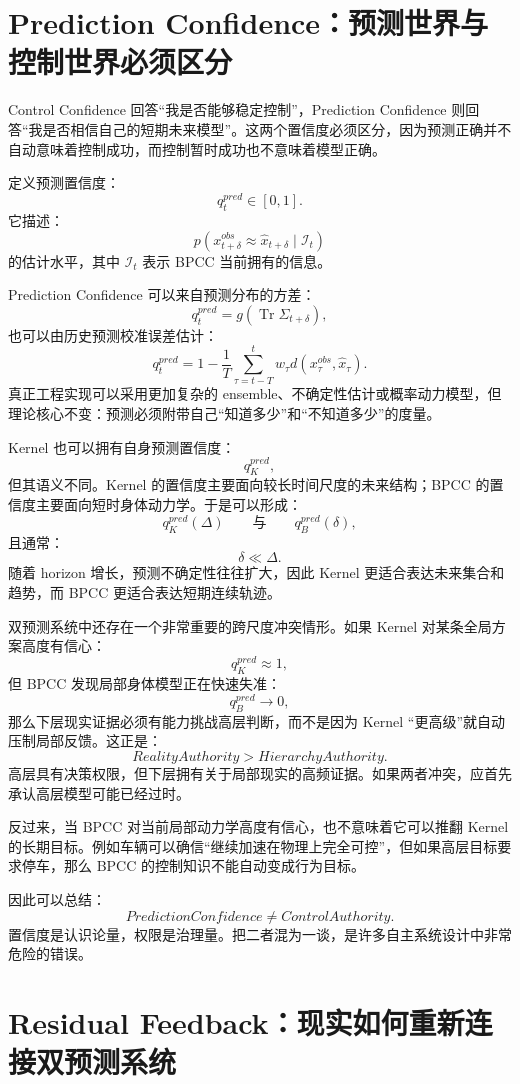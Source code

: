 \section{Prediction Confidence：预测世界与控制世界必须区分}

Control Confidence 回答“我是否能够稳定控制”，Prediction Confidence 则回答“我是否相信自己的短期未来模型”。这两个置信度必须区分，因为预测正确并不自动意味着控制成功，而控制暂时成功也不意味着模型正确。

定义预测置信度：
\[
q_t^{pred}\in[0,1].
\]
它描述：
\[
p
\left(
x_{t+\delta}^{obs}
\approx
\hat x_{t+\delta}
\mid
\mathcal I_t
\right)
\]
的估计水平，其中 $\mathcal I_t$ 表示 BPCC 当前拥有的信息。

Prediction Confidence 可以来自预测分布的方差：
\[
q_t^{pred}
=
g
\left(
\operatorname{Tr}
\Sigma_{t+\delta}
\right),
\]
也可以由历史预测校准误差估计：
\[
q_t^{pred}
=
1-
\frac{1}{T}
\sum_{\tau=t-T}^{t}
w_\tau
d
\left(
x_\tau^{obs},
\hat x_\tau
\right).
\]
真正工程实现可以采用更加复杂的 ensemble、不确定性估计或概率动力模型，但理论核心不变：预测必须附带自己“知道多少”和“不知道多少”的度量。

Kernel 也可以拥有自身预测置信度：
\[
q_K^{pred},
\]
但其语义不同。Kernel 的置信度主要面向较长时间尺度的未来结构；BPCC 的置信度主要面向短时身体动力学。于是可以形成：
\[
q_K^{pred}(\Delta)
\qquad\text{与}\qquad
q_B^{pred}(\delta),
\]
且通常：
\[
\delta\ll\Delta.
\]
随着 horizon 增长，预测不确定性往往扩大，因此 Kernel 更适合表达未来集合和趋势，而 BPCC 更适合表达短期连续轨迹。

双预测系统中还存在一个非常重要的跨尺度冲突情形。如果 Kernel 对某条全局方案高度有信心：
\[
q_K^{pred}\approx1,
\]
但 BPCC 发现局部身体模型正在快速失准：
\[
q_B^{pred}\rightarrow0,
\]
那么下层现实证据必须有能力挑战高层判断，而不是因为 Kernel “更高级”就自动压制局部反馈。这正是：
\[
\boxed{
RealityAuthority>HierarchyAuthority.
}
\]
高层具有决策权限，但下层拥有关于局部现实的高频证据。如果两者冲突，应首先承认高层模型可能已经过时。

反过来，当 BPCC 对当前局部动力学高度有信心，也不意味着它可以推翻 Kernel 的长期目标。例如车辆可以确信“继续加速在物理上完全可控”，但如果高层目标要求停车，那么 BPCC 的控制知识不能自动变成行为目标。

因此可以总结：
\[
\boxed{
PredictionConfidence
\neq
ControlAuthority.
}
\]
置信度是认识论量，权限是治理量。把二者混为一谈，是许多自主系统设计中非常危险的错误。

\section{Residual Feedback：现实如何重新连接双预测系统}

